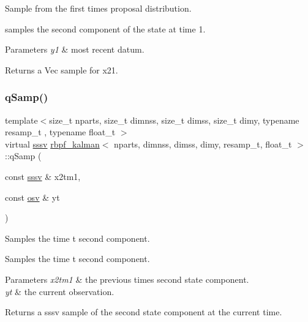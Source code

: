 Sample from the first time\textquotesingle{}s proposal distribution. 

samples the second component of the state at time 1. 
\begin{DoxyParams}{Parameters}
{\em y1} & most recent datum. \\
\hline
\end{DoxyParams}
\begin{DoxyReturn}{Returns}
a Vec sample for x21. 
\end{DoxyReturn}
\mbox{\label{classrbpf__kalman_a03a9dce900a6a917f58f43cbcb906867}} 
\subsubsection{\texorpdfstring{q\+Samp()}{qSamp()}}
{\footnotesize\ttfamily template$<$size\+\_\+t nparts, size\+\_\+t dimnss, size\+\_\+t dimss, size\+\_\+t dimy, typename resamp\+\_\+t , typename float\+\_\+t $>$ \\
virtual \hyperlink{classrbpf__kalman_a616e56c08c1a6b476e065b2200433915}{sssv} \hyperlink{classrbpf__kalman}{rbpf\+\_\+kalman}$<$ nparts, dimnss, dimss, dimy, resamp\+\_\+t, float\+\_\+t $>$\+::q\+Samp (\begin{DoxyParamCaption}\item[{const \hyperlink{classrbpf__kalman_a616e56c08c1a6b476e065b2200433915}{sssv} \&}]{x2tm1,  }\item[{const \hyperlink{classrbpf__kalman_ae6e59c034c1b0abc7871887ae088055e}{osv} \&}]{yt }\end{DoxyParamCaption})\hspace{0.3cm}{\ttfamily [pure virtual]}}



Samples the time t second component. 

Samples the time t second component. 
\begin{DoxyParams}{Parameters}
{\em x2tm1} & the previous time\textquotesingle{}s second state component. \\
\hline
{\em yt} & the current observation. \\
\hline
\end{DoxyParams}
\begin{DoxyReturn}{Returns}
a sssv sample of the second state component at the current time. 
\end{DoxyReturn}
\mbox{\label{classrbpf__kalman_a1d4dac41b89e8bfd6f54d10c737d4e42}} 
